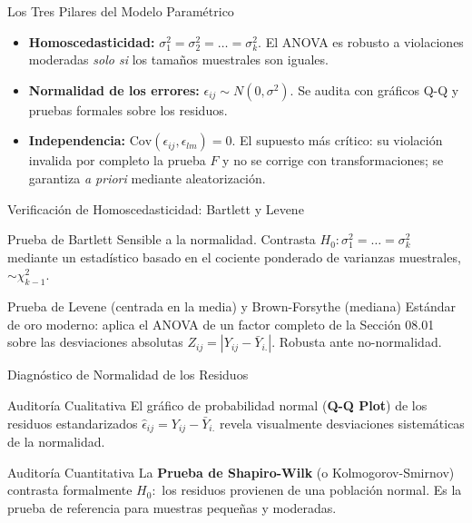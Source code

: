 \documentclass[10pt, aspectratio=169]{beamer}
\begin{document}
\begin{frame}{Los Tres Pilares del Modelo Paramétrico}
  \footnotesize
  \begin{itemize}\itemsep=0.12cm
    \item \textbf{Homoscedasticidad:} $\sigma_1^2=\sigma_2^2=\ldots=\sigma_k^2$. El ANOVA es robusto a violaciones moderadas \emph{solo si} los tamaños muestrales son iguales. \pause
    \item \textbf{Normalidad de los errores:} $\epsilon_{ij}\sim N(0,\sigma^2)$. Se audita con gráficos Q-Q y pruebas formales sobre los residuos. \pause
    \item \textbf{Independencia:} $\text{Cov}(\epsilon_{ij},\epsilon_{lm})=0$. El supuesto más crítico: su violación invalida por completo la prueba $F$ y no se corrige con transformaciones; se garantiza \emph{a priori} mediante aleatorización.
  \end{itemize}
\end{frame}

\begin{frame}{Verificación de Homoscedasticidad: Bartlett y Levene}
  \footnotesize
  \begin{block}{Prueba de Bartlett}
    Sensible a la normalidad. Contrasta $H_0:\sigma_1^2=\ldots=\sigma_k^2$ mediante un estadístico basado en el cociente ponderado de varianzas muestrales, $\sim\chi^2_{k-1}$.
  \end{block}
  \pause

  \vspace{0.1cm}
  \begin{alertblock}{Prueba de Levene (centrada en la media) y Brown-Forsythe (mediana)}
    Estándar de oro moderno: aplica el ANOVA de un factor completo de la Sección 08.01 sobre las desviaciones absolutas $Z_{ij}=|Y_{ij}-\bar Y_{i.}|$. Robusta ante no-normalidad.
  \end{alertblock}
\end{frame}

\begin{frame}{Diagnóstico de Normalidad de los Residuos}
  \footnotesize
  \begin{block}{Auditoría Cualitativa}
    El gráfico de probabilidad normal (\textbf{Q-Q Plot}) de los residuos estandarizados $\hat\epsilon_{ij}=Y_{ij}-\bar Y_{i.}$ revela visualmente desviaciones sistemáticas de la normalidad.
  \end{block}
  \pause

  \vspace{0.1cm}
  \begin{alertblock}{Auditoría Cuantitativa}
    La \textbf{Prueba de Shapiro-Wilk} (o Kolmogorov-Smirnov) contrasta formalmente $H_0:$ los residuos provienen de una población normal. Es la prueba de referencia para muestras pequeñas y moderadas.
  \end{alertblock}
\end{frame}
\end{document}
